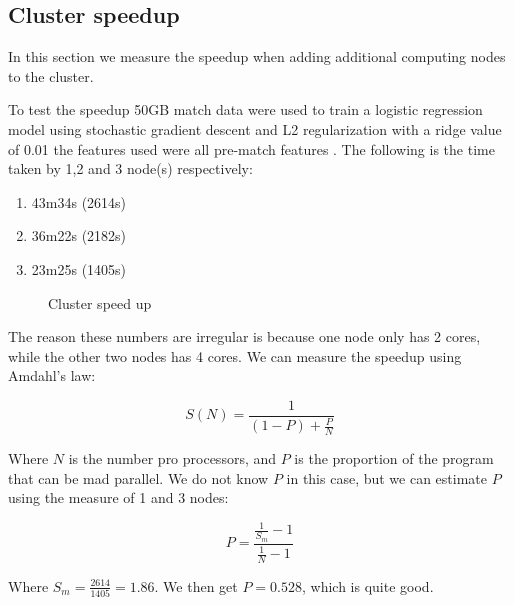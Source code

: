 \subsection{Cluster speedup}\label{sec:speedup}
In this section we measure the speedup when adding additional computing nodes to the cluster.

To test the speedup 50GB match data were used to train a logistic regression model using stochastic gradient descent and L2 regularization with a ridge value of 0.01 the features used were all pre-match features . The following is the time taken by 1,2 and 3 node(s) respectively:

\begin{enumerate}
    \item 43m34s (2614s)
    \item 36m22s (2182s)
    \item 23m25s (1405s)
\end{enumerate}


\begin{figure}[!htb]
  \centering
   \caption{Cluster speed up}\label{fig:cluster-speedup}
\end{figure}
The reason these numbers are irregular is because one node only has 2 cores, while the other two nodes has 4 cores. We can measure the speedup using Amdahl's law:

\[S(N) = \frac{1}{(1-P)+\frac{P}{N}}\]

Where $N$ is the number pro processors, and $P$ is the proportion of the program that can be mad parallel. We do not know $P$ in this case, but we can estimate $P$ using the measure of 1 and 3 nodes:

\[P = \frac{\frac{1}{S_m}-1}{\frac{1}{N}-1}  \]

Where \( S_m=\frac{2614}{1405} = 1.86 \). We then get $P = 0.528$, which is quite good.
